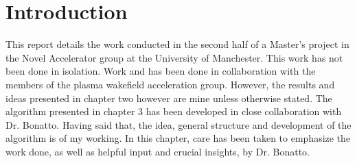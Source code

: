 \chapter{Introduction}

This report details the work conducted in the second half of a Master's project in the Novel Accelerator group at the University of Manchester. 
This work has not been done in isolation. Work and has been done in collaboration with the members of the plasma wakefield acceleration group.
However, the results and ideas presented in chapter two  however are mine unless otherwise stated. The algorithm presented in chapter 3 has been developed in close collaboration with Dr. Bonatto. Having said that, the idea, general structure and development of the algorithm is of my working. In this chapter, care has been taken to emphasize the work done, as well as helpful input and crucial insights, by Dr. Bonatto.